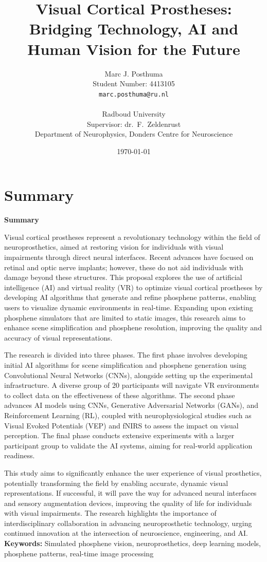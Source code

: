 \documentclass[10pt]{article}
\title{Visual Cortical Prostheses: Bridging Technology, AI and Human Vision for the Future}
\author{
  Marc J. Posthuma\\
  Student Number: 4413105\\
  \texttt{marc.posthuma@ru.nl}\\
  \\
  Radboud University\\
  Supervisor: dr.\ F.\ Zeldenrust\\
  Department of Neurophysics, Donders Centre for Neuroscience
}
\date{\today}
\makeatletter
\renewenvironment{abstract}{%
    \if@twocolumn%
      \section*{\abstractname}%
    \else
      \begin{center}%
        {\bfseries \large\abstractname\vspace{-.5em}\vspace{\z@}}%
      \end{center}%
      \quotation\small %
    \fi}
    {\if@twocolumn\else\endquotation\fi}%
\renewcommand{\abstractname}{Summary}
\makeatother
\begin{document}
\pagestyle{plain}%
\listoftodos%
\clearpage%

\newpage%

\maketitle
\thispagestyle{firstpage} %
\begin{abstract}
  \noindent Visual cortical prostheses represent a revolutionary technology
  within the field of neuroprosthetics, aimed at restoring vision for
  individuals with visual impairments through direct neural interfaces. Recent
  advances have focused on retinal and optic nerve implants; however, these do
  not aid individuals with damage beyond these structures. This proposal
  explores the use of artificial intelligence (AI) and virtual reality (VR) to
  optimize visual cortical prostheses by developing AI algorithms that generate
  and refine phosphene patterns, enabling users to visualize dynamic
  environments in real-time. Expanding upon existing phosphene simulators that
  are limited to static images, this research aims to enhance scene
  simplification and phosphene resolution, improving the quality and accuracy of
  visual representations.

  The research is divided into three phases. The first phase involves developing
  initial AI algorithms for scene simplification and phosphene generation using
  Convolutional Neural Networks (CNNs), alongside setting up the experimental
  infrastructure. A diverse group of 20 participants will navigate VR
  environments to collect data on the effectiveness of these algorithms. The
  second phase advances AI models using CNNs, Generative Adversarial Networks
  (GANs), and Reinforcement Learning (RL), coupled with neurophysiological
  studies such as Visual Evoked Potentials (VEP) and fNIRS to assess the impact
  on visual perception. The final phase conducts extensive experiments with a
  larger participant group to validate the AI systems, aiming for real-world
  application readiness.

  This study aims to significantly enhance the user experience of visual
  prosthetics, potentially transforming the field by enabling accurate, dynamic
  visual representations. If successful, it will pave the way for advanced
  neural interfaces and sensory augmentation devices, improving the quality of
  life for individuals with visual impairments. The research highlights the
  importance of interdisciplinary collaboration in advancing neuroprosthetic
  technology, urging continued innovation at the intersection of neuroscience,
  engineering, and AI.\@
\end{abstract}
\textbf{Keywords:} Simulated  phosphene vision, neuroprosthetics, deep learning models, phosphene patterns, real-time image processing
\end{document}
